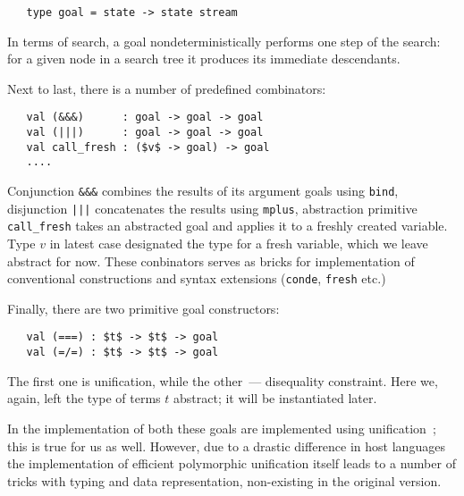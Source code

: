 \begin{lstlisting}
   type goal = state -> state stream
\end{lstlisting}

In terms of search, a goal nondeterministically performs one step of the search: for a given
node in a search tree it produces its immediate descendants.

Next to last, there is a number of predefined combinators:

\begin{lstlisting}
   val (&&&)      : goal -> goal -> goal
   val (|||)      : goal -> goal -> goal
   val call_fresh : ($v$ -> goal) -> goal
   ....
\end{lstlisting}

Conjunction \lstinline{&&&} combines the results of its argument goals using \lstinline{bind}, 
disjunction \lstinline{|||} concatenates the results using \lstinline{mplus}, abstraction
primitive \lstinline{call_fresh} takes an abstracted goal and applies it to a freshly created
variable. Type $v$ in latest case designated the type for a fresh variable, which we leave
abstract for now. These conbinators serves as bricks for implementation of conventional 
\miniKanren constructions and syntax extensions (\lstinline{conde}, \lstinline{fresh} etc.)

Finally, there are two primitive goal constructors:

\begin{lstlisting}
   val (===) : $t$ -> $t$ -> goal
   val (=/=) : $t$ -> $t$ -> goal
\end{lstlisting}

The first one is unification, while the other~--- disequality constraint. Here we, again, left 
the type of terms $t$ abstract; it will be instantiated later.

In the implementation of \miniKanren both these goals are implemented using unification~\cite{CKanren}; this
is true for us as well. However, due to a drastic difference in host languages the implementation of
efficient polymorphic unification itself leads to a number of tricks with typing and data representation,
non-existing in the original version.

